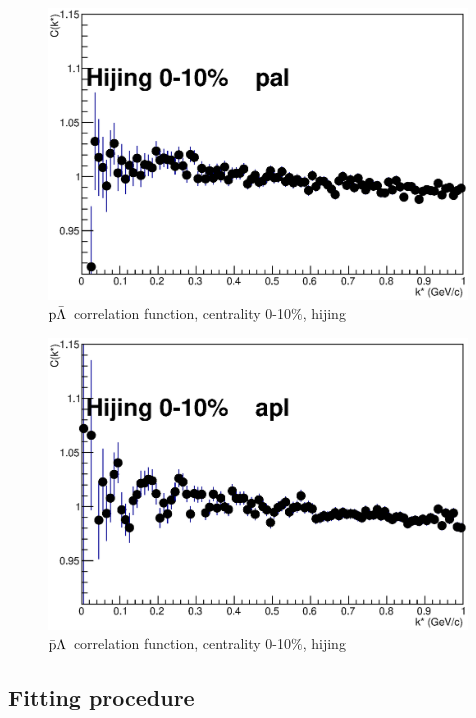 \documentclass[ALICE,manyauthors]{ALICE_analysis_notes}
\newcommand{\pal}{$\rm p\bar{\rm \Lambda}$}
\newcommand{\apl}{$\bar{\rm p }\Lambda$}
\begin{document}
\begin{figure}[]
   \centering
   \includegraphics[width=0.99\textwidth]{pics/hijingpal}
   \caption{ \pal~correlation function, centrality 0-10$\%$, hijing}
   \label{fig:palCorrFunHijing}
 \end{figure}

\begin{figure}[]
   \centering
   \includegraphics[width=0.99\textwidth]{pics/hijingapl}
   \caption{ \apl~correlation function, centrality 0-10$\%$, hijing}
   \label{fig:aplCorrFunHijing}
 \end{figure}

\subsection{Fitting procedure}
\end{document}
